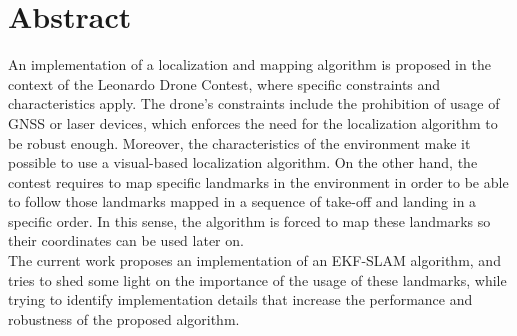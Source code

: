 
\begingroup
\let\clearpage\relax
\let\cleardoublepage\relax
\let\cleardoublepage\relax
{}
{}

\chapter*{Abstract}

An implementation of a localization and mapping algorithm is proposed in the context of the Leonardo Drone Contest, where specific constraints and characteristics apply. The drone's constraints include the prohibition of usage of GNSS or laser devices, which enforces the need for the localization algorithm to be robust enough. Moreover, the characteristics of the environment make it possible to use a visual-based localization algorithm. On the other hand, the contest requires to map specific landmarks in the environment in order to be able to follow those landmarks mapped in a sequence of take-off and landing in a specific order. In this sense, the algorithm is forced to map these landmarks so their coordinates can be used later on.\\

The current work proposes an implementation of an EKF-SLAM algorithm, and tries to shed some light on the importance of the usage of these landmarks, while trying to identify implementation details that increase the performance and robustness of the proposed algorithm.

\vfill
\newpage
{}
